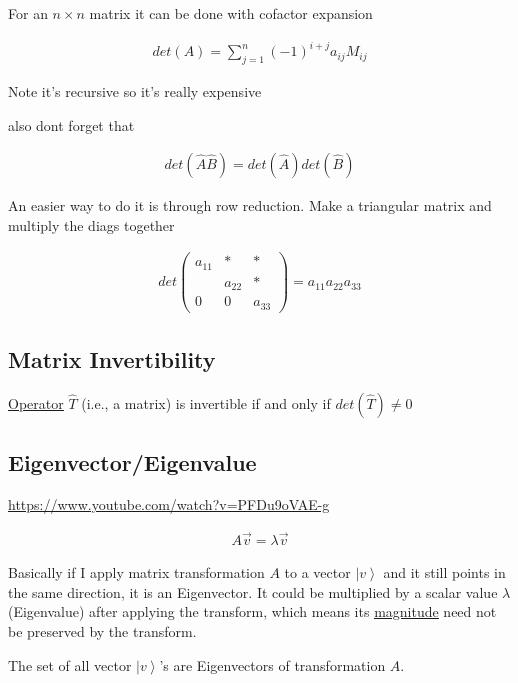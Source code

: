 \documentclass[
]{article}
\let\oldhyperref\hyperref
\renewcommand{\hyperref}[2][]{\oldhyperref[#1]{\underline{#2}}}
\providecommand{\ket}[1]{\left\lvert #1 \right\rangle}
\begin{document}
For an \(n\times n\) matrix it can be done with cofactor expansion

\begin{gather*}
	det(A)=\sum_{j=1}^n(-1)^{i+j}a_{ij}M_{ij}
\end{gather*}

Note it's recursive so it's really expensive

also dont forget that

\begin{gather*}
	det(\hat{A}\hat{B})=det(\hat{A})det(\hat B)
\end{gather*}

An easier way to do it is through row reduction. Make a triangular
matrix and multiply the diags together

\begin{gather*}
	det\begin{pmatrix}a_{11} & *      & *      \\
	                      & a_{22} & *      \\
	               0      & 0      & a_{33}
	\end{pmatrix}=a_{11}a_{22}a_{33}
\end{gather*}

\subsection{Matrix
	Invertibility}\label{invertibility-of-matrices}

\hyperref[operators]{Operator} \(\hat{T}\) (i.e., a matrix) is invertible if and only if
\(det(\hat{T})\neq0\)

\subsection{Eigenvector/Eigenvalue}\label{eigenvectorseigenvalues}

\url{https://www.youtube.com/watch?v=PFDu9oVAE-g}

\begin{gather*}
	A\vec{v}=\lambda\vec{v}
\end{gather*}

Basically if I apply matrix transformation \(A\) to a vector \(\ket{v}\)
and it still points in the same direction, it is an Eigenvector. It
could be multiplied by a scalar value \(\lambda\) (Eigenvalue) after
applying the transform, which means its \hyperref[magnitude]{magnitude} need not be preserved
by the transform.

The set of all vector \(\ket{v}\)'s are Eigenvectors of transformation
\(A\).
\end{document}
